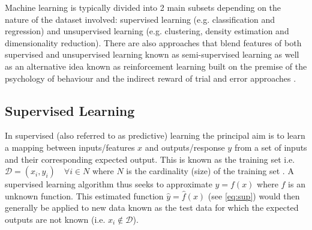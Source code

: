 

Machine learning is typically divided into 2 main subsets depending on the nature of the dataset involved: 
supervised learning (e.g. classification and regression) and unsupervised learning (e.g. clustering,
density estimation and dimensionality reduction).
There are also approaches that blend features of both supervised and unsupervised learning known as semi-supervised
learning as well as an alternative idea known as reinforcement learning built on the premise of the psychology
of behaviour and the indirect reward of trial and error approaches \citep{Bishop2006}.



\subsection{Supervised Learning}

In supervised (also referred to as predictive) learning the principal aim is 
to learn a mapping between inputs/features \(x\) and outputs/response \(y\) from a set of 
inputs and their corresponding expected output.  This is known as the training set 
i.e. \(\mathcal{D} = {(x_{i}, y_{i}) \quad \forall i \in N}\) where \(N\) is 
the cardinality (size) of the training set \citep{Murphy2012}.  
A supervised learning algorithm thus seeks to approximate \(y=f(x)\) where \(f\) is an unknown 
function. This estimated function \(\hat{y} = \hat{f}(x)\) (see \ref{eq:sup}) would then generally
be applied to new data known as the test data for which the expected outputs are not known (i.e. 
\(x_{i} \not \in \mathcal{D}\)).

